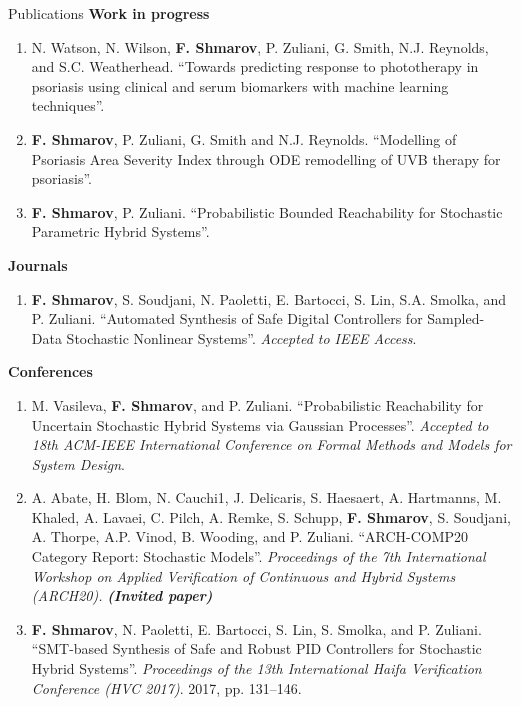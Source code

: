 \documentclass{resume} %
\begin{document}
\begin{rSection}{Publications}
{\bf Work in progress}
\begin{enumerate}
	\item N. Watson, N. Wilson, {\bf F. Shmarov}, P. Zuliani, G. Smith, N.J. Reynolds, and S.C. Weatherhead. 
	``Towards predicting response to phototherapy in psoriasis using clinical and serum biomarkers 
	with machine learning techniques''.

	\item {\bf F. Shmarov}, P. Zuliani, G. Smith and N.J. Reynolds. 
	``Modelling of Psoriasis Area Severity Index through ODE remodelling of UVB therapy for psoriasis''.

	\item {\bf F. Shmarov}, P. Zuliani.
	``Probabilistic Bounded Reachability for Stochastic Parametric Hybrid Systems''.
\end{enumerate}

{\bf Journals}
\begin{enumerate}[resume]
	\item {\bf F. Shmarov}, S. Soudjani, N. Paoletti, E. Bartocci, S. Lin, S.A. Smolka, and P. Zuliani.
	``Automated Synthesis of Safe Digital Controllers for Sampled-Data Stochastic Nonlinear Systems''.
	{\em Accepted to IEEE Access}.
\end{enumerate}


{\bf Conferences}
\begin{enumerate}[resume]
	\item M. Vasileva, {\bf F. Shmarov}, and P. Zuliani.
	``Probabilistic Reachability for Uncertain Stochastic Hybrid Systems via Gaussian Processes''.
	{\em Accepted to 18th ACM-IEEE International Conference on Formal Methods and Models for System Design}.

	\item A. Abate, H. Blom, N. Cauchi1, J. Delicaris, S. Haesaert, A. Hartmanns, M. Khaled, A. Lavaei,
	C. Pilch, A. Remke, S. Schupp, {\bf F. Shmarov}, S. Soudjani, A. Thorpe, A.P. Vinod, B. Wooding, 
	and P. Zuliani. ``ARCH-COMP20 Category Report: Stochastic Models''. 
	{\em Proceedings of the 7th International Workshop on Applied 
	Verification of Continuous and Hybrid Systems (ARCH20).} {\bf {\em (Invited paper)}}

	\item {\bf F. Shmarov}, N. Paoletti, E. Bartocci, S. Lin, S. Smolka, and P. Zuliani. 
	``SMT-based Synthesis of Safe and Robust PID Controllers for Stochastic Hybrid Systems''.
	{\em Proceedings of the 13th International Haifa Verification Conference (HVC 2017)}. 2017, pp. 131--146.


\end{enumerate}
\end{rSection}
\end{document}
